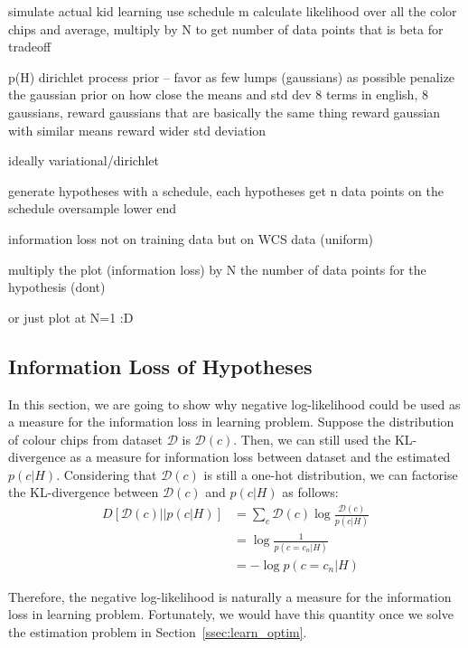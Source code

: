 \documentclass[11pt]{article}
\begin{document}
simulate actual kid learning
use schedule m
calculate likelihood over all the color chips and average, multiply by N to get number of data points
that is beta for tradeoff

p(H) dirichlet process prior -- favor as few lumps (gaussians) as possible
penalize the gaussian prior on how close the means and std dev
8 terms in english, 8 gaussians, reward gaussians that are basically the same thing
reward gaussian with similar means
reward wider std deviation


ideally variational/dirichlet

generate hypotheses with a schedule, each hypotheses get n data points on the schedule
oversample lower end

information loss not on training data but on WCS data (uniform)

multiply the plot (information loss) by N the number of data points for the hypothesis (dont)

or just plot at N=1 :D

\subsection{Information Loss of Hypotheses}
\label{ssec:learn_info_loss}

In this section, we are going to show why negative log-likelihood could be used as a measure for the information loss in learning problem.
Suppose the distribution of colour chips from dataset $\mathcal{D}$ is $\mathcal{D}(c)$.
Then, we can still used the KL-divergence as a measure for information loss between dataset and the estimated $p(c|H)$.
Considering that $\mathcal{D}(c)$ is still a one-hot distribution, we can factorise the KL-divergence between $\mathcal{D}(c)$ and $p(c|H)$ as follows:
\begin{equation}
    \begin{split}
        D[\mathcal{D}(c)||p(c|H)] & = \sum_{c} \mathcal{D}(c)\log \frac{\mathcal{D}(c)}{p(c|H)} \\
        & = \log \frac{1}{p(c=c_n|H)} \\
        & = -\log p(c=c_n|H)
    \end{split}
    \label{eq:learn_info_loss}
\end{equation}

Therefore, the negative log-likelihood is naturally a measure for the information loss in learning problem.
Fortunately, we would have this quantity once we solve the estimation problem in Section~\ref{ssec:learn_optim}.
\end{document}
